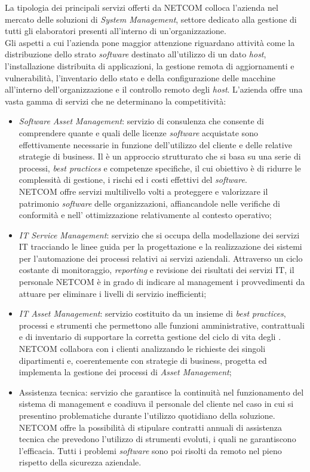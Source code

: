 La tipologia dei principali servizi offerti da NETCOM colloca l’azienda nel mercato delle soluzioni di \emph{System Management}, settore dedicato alla gestione di tutti gli elaboratori presenti all’interno di un’organizzazione.\\
Gli aspetti a cui l'azienda pone maggior attenzione riguardano attività come la distribuzione dello strato \emph{software} destinato all’utilizzo di un dato \emph{host}, l’installazione distribuita di applicazioni, la gestione remota di aggiornamenti e vulnerabilità, l’inventario dello stato e della configurazione delle macchine all’interno dell’organizzazione e il controllo remoto degli \emph{host}.
L'azienda offre una vasta gamma di servizi che ne determinano la competitività:
\begin{itemize}
\item \emph{Software Asset Management}: servizio di consulenza che consente di comprendere quante e quali delle licenze \emph{software} acquistate sono effettivamente necessarie in funzione dell'utilizzo del cliente e delle relative strategie di business. Il  è un approccio strutturato che si basa su una serie di processi, \textit{best practices} e competenze specifiche, il cui obiettivo è di ridurre le complessità di gestione, i rischi ed i costi effettivi del \emph{software}.\\
NETCOM offre servizi multilivello volti a proteggere e valorizzare il patrimonio \emph{software} delle organizzazioni, affiancandole nelle verifiche di conformità e nell’ ottimizzazione relativamente al contesto operativo;
\item  \emph{IT Service Management}: servizio che si occupa della modellazione dei servizi IT tracciando le linee guida per la progettazione e la realizzazione dei sistemi per l’automazione dei processi relativi ai servizi aziendali. Attraverso un ciclo costante di monitoraggio, \emph{reporting} e revisione dei risultati dei servizi IT, il personale NETCOM è in grado di indicare al management i provvedimenti da attuare per eliminare i livelli di servizio inefficienti;
\item \emph{IT Asset Management}: servizio costituito da un insieme di \textit{best practices}, processi e strumenti che permettono alle funzioni amministrative, contrattuali e di inventario di supportare la corretta gestione del ciclo di vita degli . \\ 
NETCOM collabora con i clienti analizzando le richieste dei singoli dipartimenti e, coerentemente con strategie di business, progetta ed implementa la gestione dei processi di \emph{Asset Management};
\item Assistenza tecnica: servizio che garantisce la continuità nel funzionamento del sistema di management e coadiuva il personale del cliente nel caso in cui si presentino problematiche durante l’utilizzo quotidiano della soluzione. NETCOM offre la possibilità di stipulare contratti annuali di assistenza tecnica che prevedono l'utilizzo di strumenti evoluti, i quali ne garantiscono l'efficacia. Tutti i problemi \emph{software} sono poi risolti da remoto nel pieno rispetto della sicurezza aziendale. \cite{netcom-info}
\end{itemize}

